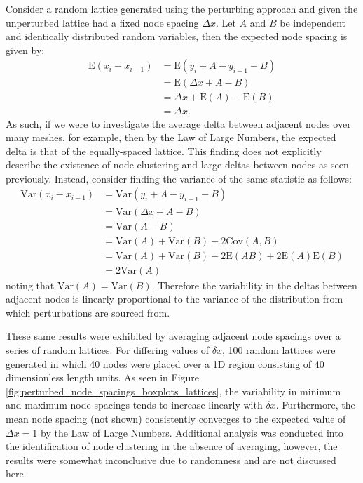 \documentclass[11pt,a4paper]{article}
\begin{document}
			Consider a random lattice generated using the perturbing approach and given the unperturbed lattice had a fixed node spacing $\Delta x$. Let $A$ and $B$ be independent and identically distributed random variables, then the expected node spacing is given by:
			\begin{align*}
				\mathrm{E} \left(x_i - x_{i-1} \right) &= \mathrm{E} \left(y_i + A - y_{i-1} - B \right) \\
				&= \mathrm{E} \left(\Delta x + A - B \right) \\
				&= \Delta x + \mathrm{E} \left(A \right) - \mathrm{E} \left(B \right) \\
				&= \Delta x.
			\end{align*}
			As such, if we were to investigate the average delta between adjacent nodes over many meshes, for example, then by the Law of Large Numbers, the expected delta is that of the equally-spaced lattice. This finding does not explicitly describe the existence of node clustering and large deltas between nodes as seen previously. Instead, consider finding the variance of the same statistic as follows:
			\begin{align*}
				\mathrm{Var} \left(x_i - x_{i-1} \right) &= \mathrm{Var} \left(y_i + A - y_{i-1} - B \right) \\
				&= \mathrm{Var} \left(\Delta x + A - B \right) \\
				&= \mathrm{Var} \left(A - B \right) \\
				&= \mathrm{Var} \left(A \right) + \mathrm{Var} \left(B \right) - 2 \mathrm{Cov} \left(A, B \right) \\ 
				&= \mathrm{Var} \left(A \right) + \mathrm{Var} \left(B \right) - 2 \mathrm{E} \left(AB \right) + 2 \mathrm{E} \left(A \right) \mathrm{E} \left(B \right) \\ 
				&= 2 \mathrm{Var} \left(A \right)
			\end{align*}
			noting that $\mathrm{Var} \left(A \right) = \mathrm{Var} \left(B \right)$. Therefore the variability in the deltas between adjacent nodes is linearly proportional to the variance of the distribution from which perturbations are sourced from.
		
			These same results were exhibited by averaging adjacent node spacings over a series of random lattices. For differing values of $\delta x$, 100 random lattices were generated in which 40 nodes were placed over a 1D region consisting of 40 dimensionless length units. As seen in Figure \ref{fig:perturbed_node_spacings_boxplots_lattices}, the variability in minimum and maximum node spacings tends to increase linearly with $\delta x$. Furthermore, the mean node spacing (not shown) consistently converges to the expected value of $\Delta x = 1$ by the Law of Large Numbers. Additional analysis was conducted into the identification of node clustering in the absence of averaging, however, the results were somewhat inconclusive due to randomness and are not discussed here. 
\end{document}
